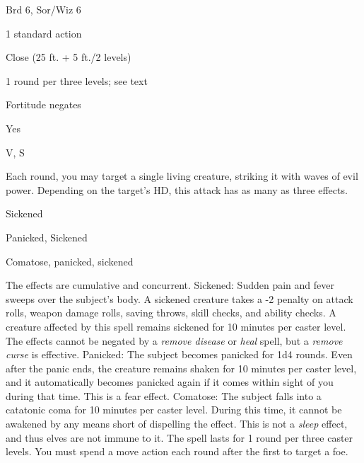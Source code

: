 
\begin{description*}
\item[Level:] Brd 6, Sor/Wiz 6
\item[Casting Time:] 1 standard action
\item[Range:] Close (25 ft. + 5 ft./2 levels)
\item[Duration:] 1 round per three levels; see text
\item[Saving Throw:] Fortitude negates
\item[Spell Resistance:] Yes
\item[Components:] V, S
\end{description*}

Each round, you may target a single living creature, striking it with waves of
evil power. Depending on the target's HD, this attack has as many as three effects.
\begin{description*}
\item[10 or More] Sickened
\item[5-9] Panicked, Sickened
\item[4 or Less] Comatose, panicked, sickened
\end{description*}
The effects are cumulative and concurrent.
Sickened: Sudden pain and fever sweeps over the subject's body. A sickened
creature takes a -2 penalty on attack rolls, weapon damage rolls, saving throws,
skill checks, and ability checks. A creature affected by this spell remains sickened
for 10 minutes per caster level. The effects cannot be negated by a \textit{remove
disease} or \textit{heal} spell, but a \textit{remove curse} is effective.
Panicked: The subject becomes panicked for 1d4 rounds. Even after the
panic ends, the creature remains shaken for 10 minutes per caster level, and it
automatically becomes panicked again if it comes within sight of you during that
time. This is a fear effect.
Comatose: The subject falls into a catatonic coma for 10 minutes per caster
level. During this time, it cannot be awakened by any means short of dispelling
the effect. This is not a \textit{sleep} effect, and thus elves are not immune
to it.
The spell lasts for 1 round per three caster levels. You must spend a move action
each round after the first to target a foe.